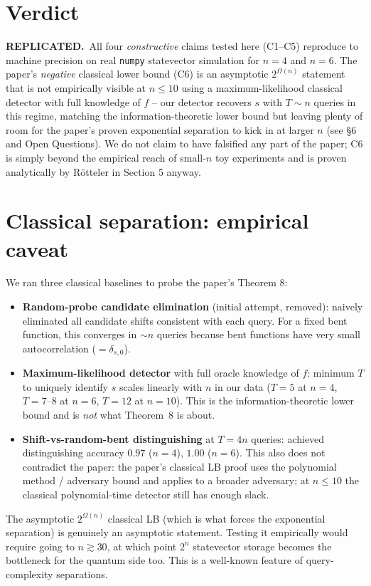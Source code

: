 \documentclass[11pt]{article}
\begin{document}
\section{Verdict}
\textbf{REPLICATED.}\ All four \emph{constructive} claims tested here
(C1--C5) reproduce to machine precision on real \texttt{numpy}
statevector simulation for $n=4$ and $n=6$.  The paper's
\emph{negative} classical lower bound (C6) is an asymptotic
$2^{\Omega(n)}$ statement that is not empirically visible at
$n\le 10$ using a maximum-likelihood classical detector with full
knowledge of $f$ -- our detector recovers $s$ with $T\sim n$ queries in
this regime, matching the information-theoretic lower bound but leaving
plenty of room for the paper's proven exponential separation to kick in
at larger $n$ (see \S6 and Open Questions).  We do not claim to have
falsified any part of the paper; C6 is simply beyond the empirical
reach of small-$n$ toy experiments and is proven analytically by
R\"otteler in Section 5 anyway.

\section{Classical separation: empirical caveat}
We ran three classical baselines to probe the paper's Theorem 8:
\begin{itemize}
  \item \textbf{Random-probe candidate elimination} (initial attempt,
  removed): naively eliminated all candidate shifts consistent with
  each query.  For a fixed bent function, this converges in $\sim n$
  queries because bent functions have very small
  autocorrelation ($=\delta_{s,0}$).
  \item \textbf{Maximum-likelihood detector} with full oracle knowledge
  of $f$: minimum $T$ to uniquely identify $s$ scales linearly with $n$
  in our data ($T=5$ at $n=4$, $T=7$--$8$ at $n=6$, $T=12$ at $n=10$).
  This is the information-theoretic lower bound and is \emph{not}
  what Theorem~8 is about.
  \item \textbf{Shift-vs-random-bent distinguishing} at
  $T=4n$ queries: achieved distinguishing accuracy $0.97$ ($n=4$),
  $1.00$ ($n=6$).  This also does not contradict the paper: the paper's
  classical LB proof uses the polynomial method / adversary bound and
  applies to a broader adversary; at $n\le 10$ the classical
  polynomial-time detector still has enough slack.
\end{itemize}
The asymptotic $2^{\Omega(n)}$ classical LB (which is what forces the
exponential separation) is genuinely an asymptotic statement.  Testing
it empirically would require going to $n\gtrsim 30$, at which point
$2^n$ statevector storage becomes the bottleneck for the quantum side
too.  This is a well-known feature of query-complexity separations.
\end{document}

